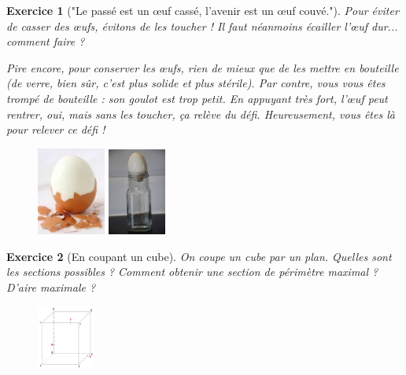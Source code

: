 \documentclass[12pt]{article}
\theoremstyle{break}
\newtheorem{exo}{Exercice}
\begin{document}
\begin{exo}["Le passé est un œuf cassé, l'avenir est un œuf couvé."]
Pour éviter de casser des œufs, évitons de les toucher ! Il faut néanmoins écailler l’œuf dur... comment faire ?

Pire encore, pour conserver les œufs, rien de mieux que de les mettre en bouteille (de verre, bien sûr, c'est plus solide et plus stérile). Par contre, vous vous êtes trompé de bouteille : son goulot est trop petit. En appuyant très fort, l’œuf peut rentrer, oui, mais sans les toucher, ça relève du défi. Heureusement, vous êtes là pour relever ce défi !


\begin{figure}[h!]
	\centering
    \includegraphics[width=0.2\textwidth]{images/OeufEcaille.jpg}
    \includegraphics[width=0.17\textwidth]{images/OeufEnBouteille.jpg}
\end{figure}
\end{exo}


\begin{exo}[En coupant un cube]
On coupe un cube par un plan. Quelles sont les sections possibles ? Comment obtenir une section de périmètre maximal ? D'aire maximale ?

\begin{figure}[h!]
	\centering
    \includegraphics[width=0.17\textwidth]{images/Cube.png}
    
\end{figure}
\end{exo}
\end{document}
